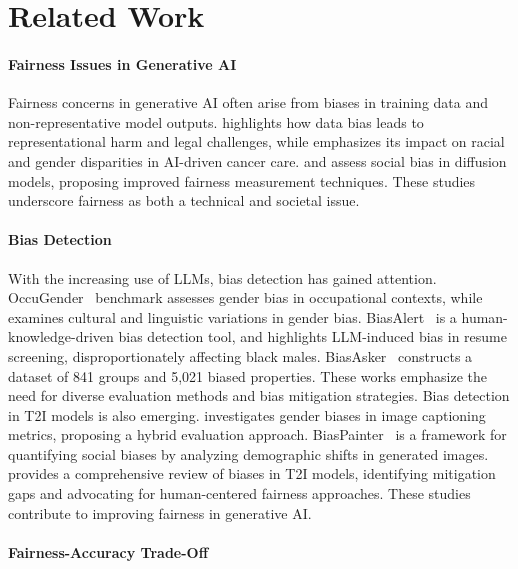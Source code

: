 \section{Related Work}

\paragraph{Fairness Issues in Generative AI}   

Fairness concerns in generative AI often arise from biases in training data and non-representative model outputs. \citet{xiang2024fairness} highlights how data bias leads to representational harm and legal challenges, while \citet{ghassemi2024limiting} emphasizes its impact on racial and gender disparities in AI-driven cancer care. \citet{luccioni2024stable} and \citet{teo2024measuring} assess social bias in diffusion models, proposing improved fairness measurement techniques. These studies underscore fairness as both a technical and societal issue.

\paragraph{Bias Detection}

With the increasing use of LLMs, bias detection has gained attention. OccuGender~\cite{chen2024causally} benchmark assesses gender bias in occupational contexts, while \citet{zhao2024gender} examines cultural and linguistic variations in gender bias. BiasAlert~\cite{fan2024biasalert} is a human-knowledge-driven bias detection tool, and \citet{wilson2024gender} highlights LLM-induced bias in resume screening, disproportionately affecting black males. BiasAsker~\citet{wan2023biasasker} constructs a dataset of 841 groups and 5,021 biased properties. These works emphasize the need for diverse evaluation methods and bias mitigation strategies.
Bias detection in T2I models is also emerging. \citet{qiu2023gender} investigates gender biases in image captioning metrics, proposing a hybrid evaluation approach. BiasPainter~\cite{wang2024new} is a framework for quantifying social biases by analyzing demographic shifts in generated images. \citet{wan2024survey} provides a comprehensive review of biases in T2I models, identifying mitigation gaps and advocating for human-centered fairness approaches. These studies contribute to improving fairness in generative AI.

\paragraph{Fairness-Accuracy Trade-Off} 

